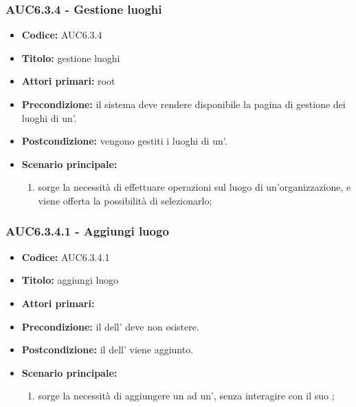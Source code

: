 \documentclass[casi-duso]{subfiles}
\begin{document}
\subsubsection{AUC6.3.4 - Gestione luoghi}%
\label{subsub:AUC6.3.4}
\begin{itemize}
  \item \textbf{Codice:} AUC6.3.4
  \item \textbf{Titolo:} gestione luoghi
  \item \textbf{Attori primari:} root
  \item \textbf{Precondizione:} il sistema deve rendere disponibile la pagina di gestione dei luoghi di un'.
  \item \textbf{Postcondizione:} vengono gestiti i luoghi di un'.
  \item \textbf{Scenario principale:}
  \begin{enumerate}
    \item sorge la necessità di effettuare operazioni sul luogo di un'organizzazione, e viene offerta la possibilità di selezionarlo;
  \end{enumerate}
\end{itemize}

\subsubsection{AUC6.3.4.1 - Aggiungi luogo}%
\label{subsub:AUC6.3.4.1}
\begin{itemize}
  \item \textbf{Codice:} AUC6.3.4.1
  \item \textbf{Titolo:} aggiungi luogo
  \item \textbf{Attori primari:} 
  \item \textbf{Precondizione:} il  dell' deve non esistere.
  \item \textbf{Postcondizione:} il  dell' viene aggiunto.
  \item \textbf{Scenario principale:}
  \begin{enumerate}
    \item sorge la necessità di aggiungere un  ad un', senza interagire con il suo ;
  \end{enumerate}
\end{itemize}
\end{document}
